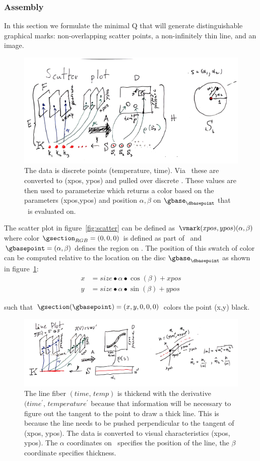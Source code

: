 \documentclass[../main.tex]{subfiles}
\begin{document}
\subsubsection{Assembly \vmark}
In this section we formulate the minimal Q that will generate distinguishable graphical marks: non-overlapping scatter points, a non-infinitely thin line, and an image. 
\begin{figure}[H]
    \includegraphics[width=.75\textwidth]{figures/math/scatter.png}
    \caption{The data is discrete points (temperature, time). Via \vchannel\ these are converted to (xpos, ypos) and pulled over discrete \gbase. These values are then used to parameterize \gsection which returns a color based on the parameters (xpos,ypos) and position $\alpha, \beta$ on $\gbase_{\dbasepoint}$ that \gsection\ is evaluated on. 
    }
    \label{fig:artist_scatter}
\end{figure}
The scatter plot in figure~\ref{fig:scatter} can be defined as $\vmark(xpos, ypos)(\alpha, \beta)$ where color $\gsection_{RGB} = (0,0,0)$ is defined as part of \vmark\ and $\gbasepoint=(\alpha, \beta)$ defines the region on \gbase. The position of this swatch of color can be computed relative to the location on the disc $\gbase_{\dbasepoint}$ as shown in figure~\ref{fig:artist_scatter}:
\begin{align}
x &= size\bullet \alpha \bullet \cos(\beta) + xpos\\
y &= size\bullet \alpha \bullet \sin(\beta) + ypos
\end{align}

such that $\gsection(\gbasepoint) = (x, y, 0, 0, 0)$ colors the point (x,y) black.
\begin{figure}[H]
    \includegraphics[width=.75\textwidth]{figures/math/line.png}
    \caption{The line fiber $(time,\, temp)$ is thickend with the derivative $(time^{\prime},\, temperature^{\prime}$ because that information will be necessary to figure out the tangent to the point to draw a thick line. This is because the line needs to be pushed perpendicular to the tangent of (xpos, ypos).  The data is converted to visual characteristics (xpos, ypos). The $\alpha$ coordinates on \gbase\ specifies the position of the line, the $\beta$ coordinate specifies thickness.}
    \label{fig:artist_line}
\end{figure}
\end{document}
